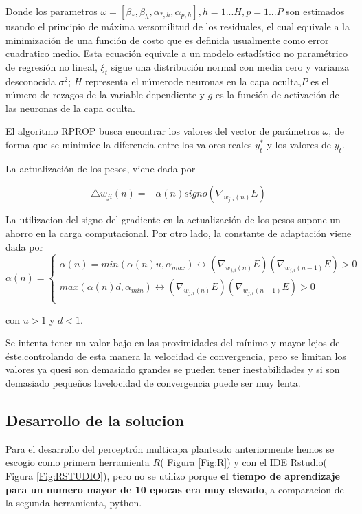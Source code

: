 \documentclass[12pt]{article}
\begin{document}
Donde los parametros $\omega = [\beta_*, \beta_h, \alpha_{*,h}, \alpha_{p,h}], h=1...H, p=1...P$ son estimados usando el principio de máxima versomilitud de los residuales, el cual equivale a la minimización de una función de costo que es definida usualmente como error cuadratico medio. Esta ecuación equivale a un modelo estadístico no paramétrico de regresión no lineal, $\xi_t$ sigue una distribución normal con media cero y varianza desconocida $\sigma^2$; $H$ representa el númerode neuronas en la capa oculta,$P$ es el número de rezagos de la variable dependiente y $g$ es la función de activación de las neuronas de la capa oculta.

El algoritmo RPROP busca encontrar los valores del vector de parámetros $\omega$, de forma que se minimice la diferencia entre los valores reales $y_t^*$ y los valores de $y_t$.

La actualización de los pesos, viene dada por

\begin{equation}
\triangle w_{ji}(n) = -\alpha(n) signo(\nabla_{w_{j,i}(n)}E)
\end{equation}

La utilizacion del signo del gradiente en la actualización de los pesos supone un ahorro en la carga computacional. Por otro lado, la constante  de adaptación viene dada por
\begin{equation}
\alpha(n) = 
\begin{cases}
\alpha(n) = 	min(	\alpha(n)u,\alpha_{max}) \longleftrightarrow (\nabla_{w_{j,i}(n)}E)(\nabla_{w_{j,i}(n-1)}E)>0 \\
max(	\alpha(n)d,\alpha_{min}) \longleftrightarrow (\nabla_{w_{j,i}(n)}E)(\nabla_{w_{j,i}(n-1)}E)>0 \\
\end{cases} \quad
\end{equation}

con $u > 1$ y $ d < 1 $.

Se intenta tener un valor bajo en las proximidades del mínimo y mayor lejos de éste.controlando de esta manera la velocidad de convergencia, pero se limitan los valores ya quesi son demasiado grandes se pueden tener inestabilidades y si son demasiado pequeños lavelocidad de convergencia puede ser muy lenta.

\subsection{Desarrollo de la solucion}
Para el desarrollo del perceptrón multicapa planteado anteriormente hemos se escogio como primera herramienta $R$( Figura \ref{Fig:R}) y con el IDE Rstudio( Figura \ref{Fig:RSTUDIO}), pero no se utilizo  porque \textbf{el tiempo de aprendizaje para un numero mayor de 10 epocas era muy elevado}, a comparacion de la segunda herramienta, python.
\end{document}
